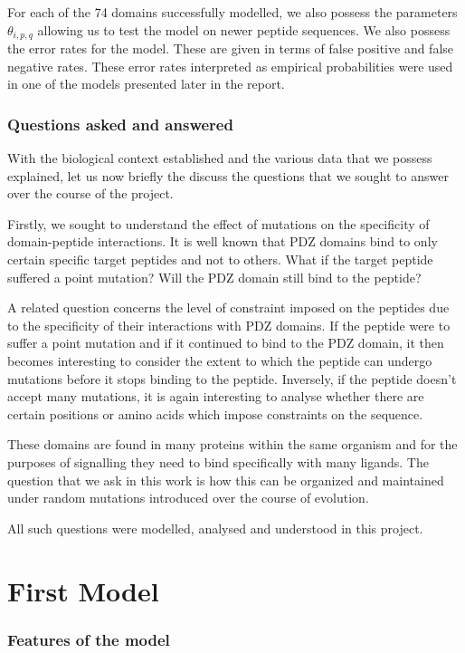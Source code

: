 \documentclass[a4paper, 12pt]{article}
\begin{document}
	For each of the 74 domains successfully modelled, we also possess the parameters $\theta_{i,p,q}$ allowing us to test the model on newer peptide sequences. We also possess the error rates for the model. These are given in terms of false positive and false negative rates. These error rates interpreted as empirical probabilities were used in one of the models presented later in the report.

	\section{Questions asked and answered}

	With the biological context established and the various data that we possess explained, let us now briefly the discuss the questions that we sought to answer over the course of the project. 

	Firstly, we sought to understand the effect of mutations on the specificity of domain-peptide interactions. It is well known that PDZ domains bind to only certain specific target peptides and not to others. What if the target peptide suffered a point mutation? Will the PDZ domain still bind to the peptide? 

	A related question concerns the level of constraint imposed on the peptides due to the specificity of their interactions with PDZ domains. If the peptide were to suffer a point mutation and if it continued to bind to the PDZ domain, it then becomes interesting to consider the extent to which the peptide can undergo mutations before it stops binding to the peptide. Inversely, if the peptide doesn't accept many mutations, it is again interesting to analyse whether there are certain positions or amino acids which impose constraints on the sequence. 
	
	These domains are found in many proteins within the same organism and for the purposes of signalling they need to bind specifically with many ligands. The question that we ask in this work is how this can be organized and maintained under random mutations introduced over the course of evolution. 

	All such questions were modelled, analysed and understood in this project.

\pagebreak
\part{First Model}
	\section{Features of the model}
\end{document}
